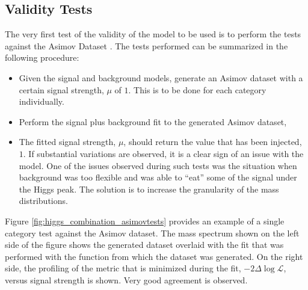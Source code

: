 \subsection{Validity Tests}
The very first test of the validity of the model to be used is to perform the
tests against the Asimov Dataset \cite{Asymptotic}. The tests performed can be summarized in the following procedure:
\begin{itemize}
    \item Given the signal and background models, generate an Asimov dataset with a certain signal strength, $\mu$ of $1$. This is to be done for each category individually.
    \item Perform the signal plus background fit to the generated Asimov dataset,
    \item The fitted signal strength, $\mu$, should return the value that has been injected, $1$. If substantial variations are observed, it is a clear sign of an issue with the model. One of the issues observed during such tests was the situation when background was too flexible and was able to ``eat'' some of the signal under the Higgs peak. The solution is to increase the granularity of the mass distributions.
\end{itemize}
Figure \ref{fig:higgs_combination_asimovtests} provides an example of a single category test against the Asimov dataset. The mass spectrum shown on the left side of the figure shows the generated dataset overlaid with the fit that was performed with the function from which the dataset was generated. On the right side, the profiling of the metric that is minimized during the fit, $-2\Delta\log{\mathcal{L}}$, versus signal strength is shown. Very good agreement is observed.
